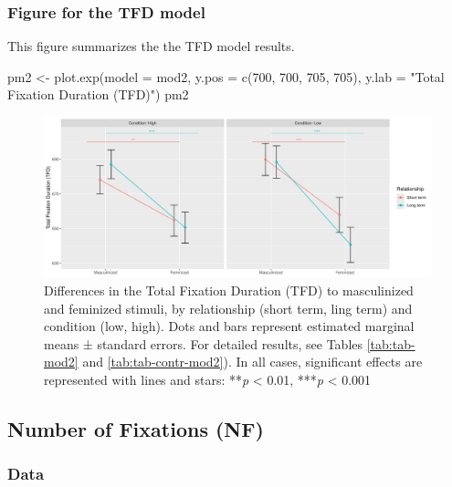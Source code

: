 \documentclass[
  bookmarksnumbered]{article}
\newenvironment{Shaded}{\begin{snugshade}}{\end{snugshade}}
\newcommand{\AttributeTok}[1]{\textcolor[rgb]{0.80,0.80,0.80}{#1}}
\newcommand{\DecValTok}[1]{\textcolor[rgb]{0.86,0.86,0.80}{#1}}
\newcommand{\FunctionTok}[1]{\textcolor[rgb]{0.94,0.94,0.56}{#1}}
\newcommand{\NormalTok}[1]{\textcolor[rgb]{0.80,0.80,0.80}{#1}}
\newcommand{\OtherTok}[1]{\textcolor[rgb]{0.94,0.94,0.56}{#1}}
\newcommand{\StringTok}[1]{\textcolor[rgb]{0.80,0.58,0.58}{#1}}
\begin{document}
\subsubsection{Figure for the TFD model}\label{figure-for-the-tfd-model}

This figure summarizes the the TFD model results.

\begin{Shaded}
\begin{Highlighting}[]
\NormalTok{pm2 }\OtherTok{\textless{}{-}} \FunctionTok{plot.exp}\NormalTok{(}\AttributeTok{model =}\NormalTok{ mod2, }
                \AttributeTok{y.pos =} \FunctionTok{c}\NormalTok{(}\DecValTok{700}\NormalTok{, }\DecValTok{700}\NormalTok{, }\DecValTok{705}\NormalTok{, }\DecValTok{705}\NormalTok{),}
                \AttributeTok{y.lab =} \StringTok{"Total Fixation Duration (TFD)"}\NormalTok{)}
\NormalTok{pm2}
\end{Highlighting}
\end{Shaded}

\begin{figure}
\centering
\includegraphics{Supplementary_material_files/figure-latex/fig-mod2-1.pdf}
\caption{\label{fig:fig-mod2}Differences in the Total Fixation Duration (TFD) to masculinized and feminized stimuli, by relationship (short term, ling term) and condition (low, high). Dots and bars represent estimated marginal means ± standard errors. For detailed results, see Tables \ref{tab:tab-mod2} and \ref{tab:tab-contr-mod2}). In all cases, significant effects are represented with lines and stars: **\emph{p} \textless{} 0.01, ***\emph{p} \textless{} 0.001}
\end{figure}

\subsection{Number of Fixations (NF)}\label{number-of-fixations-nf}

\subsubsection{Data}\label{data-2}
\end{document}
